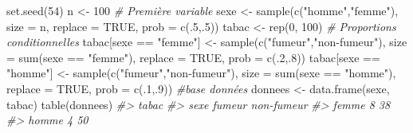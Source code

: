 \documentclass[
]{book}
\newenvironment{Shaded}{}{}
\newcommand{\AttributeTok}[1]{#1}
\newcommand{\CommentTok}[1]{\textit{#1}}
\newcommand{\ConstantTok}[1]{#1}
\newcommand{\DecValTok}[1]{#1}
\newcommand{\FunctionTok}[1]{#1}
\newcommand{\NormalTok}[1]{#1}
\newcommand{\OtherTok}[1]{#1}
\newcommand{\SpecialCharTok}[1]{#1}
\newcommand{\StringTok}[1]{#1}
\begin{document}
\begin{Shaded}
\begin{Highlighting}[]
  \FunctionTok{set.seed}\NormalTok{(}\DecValTok{54}\NormalTok{)}
\NormalTok{  n }\OtherTok{\textless{}{-}} \DecValTok{100}
  \CommentTok{\# Première variable}
\NormalTok{  sexe }\OtherTok{\textless{}{-}} \FunctionTok{sample}\NormalTok{(}\FunctionTok{c}\NormalTok{(}\StringTok{"homme"}\NormalTok{,}\StringTok{"femme"}\NormalTok{), }
                \AttributeTok{size =}\NormalTok{ n, }
                \AttributeTok{replace =} \ConstantTok{TRUE}\NormalTok{, }
                \AttributeTok{prob =} \FunctionTok{c}\NormalTok{(.}\DecValTok{5}\NormalTok{,.}\DecValTok{5}\NormalTok{))}
\NormalTok{  tabac }\OtherTok{\textless{}{-}} \FunctionTok{rep}\NormalTok{(}\DecValTok{0}\NormalTok{, }\DecValTok{100}\NormalTok{)}
  \CommentTok{\# Proportions conditionnelles}
\NormalTok{  tabac[sexe }\SpecialCharTok{==} \StringTok{"femme"}\NormalTok{] }\OtherTok{\textless{}{-}} \FunctionTok{sample}\NormalTok{(}\FunctionTok{c}\NormalTok{(}\StringTok{"fumeur"}\NormalTok{,}\StringTok{"non{-}fumeur"}\NormalTok{), }
                                    \AttributeTok{size =} \FunctionTok{sum}\NormalTok{(sexe }\SpecialCharTok{==} \StringTok{"femme"}\NormalTok{), }
                                    \AttributeTok{replace =} \ConstantTok{TRUE}\NormalTok{, }
                                    \AttributeTok{prob =} \FunctionTok{c}\NormalTok{(.}\DecValTok{2}\NormalTok{,.}\DecValTok{8}\NormalTok{))}
\NormalTok{  tabac[sexe }\SpecialCharTok{==} \StringTok{"homme"}\NormalTok{] }\OtherTok{\textless{}{-}} \FunctionTok{sample}\NormalTok{(}\FunctionTok{c}\NormalTok{(}\StringTok{"fumeur"}\NormalTok{,}\StringTok{"non{-}fumeur"}\NormalTok{), }
                                    \AttributeTok{size =} \FunctionTok{sum}\NormalTok{(sexe }\SpecialCharTok{==} \StringTok{"homme"}\NormalTok{), }
                                    \AttributeTok{replace =} \ConstantTok{TRUE}\NormalTok{, }
                                    \AttributeTok{prob =} \FunctionTok{c}\NormalTok{(.}\DecValTok{1}\NormalTok{,.}\DecValTok{9}\NormalTok{))}
  \CommentTok{\#base données}
\NormalTok{  donnees }\OtherTok{\textless{}{-}} \FunctionTok{data.frame}\NormalTok{(sexe, tabac)}
  \FunctionTok{table}\NormalTok{(donnees)}
\CommentTok{\#\textgreater{}        tabac}
\CommentTok{\#\textgreater{} sexe    fumeur non{-}fumeur}
\CommentTok{\#\textgreater{}   femme      8         38}
\CommentTok{\#\textgreater{}   homme      4         50}
\end{Highlighting}
\end{Shaded}
\end{document}
